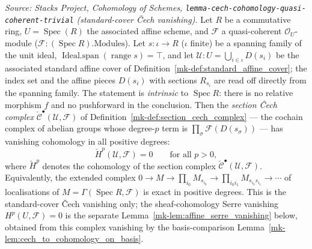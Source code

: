 \begin{lemma}
  \textit{Source: Stacks Project, Cohomology of Schemes,
  \texttt{lemma-cech-cohomology-quasi-coherent-trivial} (standard-cover {\v C}ech
  vanishing).}
  Let \(R\) be a commutative ring, \(U = \operatorname{Spec}(R)\) the associated
  affine scheme, and \(\mathcal{F}\) a quasi-coherent \(\mathcal{O}_U\)-module
  (\(\mathcal{F} : (\operatorname{Spec} R).\mathrm{Modules}\)). Let
  \(s : \iota \to R\) (\(\iota\) finite) be a spanning family of the unit ideal,
  \(\operatorname{Ideal.span}(\operatorname{range} s) = \top\), and let
  \(\mathcal{U} : U = \bigcup_{i \in \iota} D(s_i)\) be the associated standard
  affine cover of Definition~\ref{mk-def:standard_affine_cover}; the index set and the
  affine pieces \(D(s_i)\) with sections \(R_{s_i}\) are read off directly from the
  spanning family. The statement is \emph{intrinsic} to \(\operatorname{Spec} R\):
  there is no relative morphism \(f\) and no pushforward in the conclusion. Then the
  \emph{section {\v C}ech complex} \(\check{\mathcal{C}}^\bullet(\mathcal{U},
  \mathcal{F})\) of Definition~\ref{mk-def:section_cech_complex} --- the cochain
  complex of abelian groups whose degree-\(p\) term is
  \(\prod_{\sigma}\mathcal{F}(D(s_\sigma))\) --- has vanishing cohomology in all
  positive degrees:
  \[
    \check{H}^p(\mathcal{U}, \mathcal{F}) = 0 \qquad \text{for all } p > 0,
  \]
  where \(\check{H}^p\) denotes the cohomology of the section complex
  \(\check{\mathcal{C}}^\bullet(\mathcal{U}, \mathcal{F})\). Equivalently, the
  extended complex
  \(0 \to M \to \prod_{i_0} M_{s_{i_0}} \to \prod_{i_0 i_1} M_{s_{i_0} s_{i_1}}
  \to \cdots\) of localisations of \(M = \Gamma(\operatorname{Spec} R, \mathcal{F})\)
  is exact in positive degrees. This is the standard-cover {\v C}ech vanishing
  only; the sheaf-cohomology Serre vanishing \(H^p(U, \mathcal{F}) = 0\) is the
  separate Lemma~\ref{mk-lem:affine_serre_vanishing} below, obtained from this complex
  vanishing by the basis-comparison Lemma~\ref{mk-lem:cech_to_cohomology_on_basis}.
\end{lemma}
